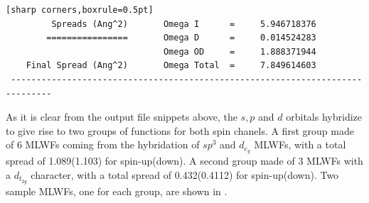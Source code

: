 \begin{enumerate}
\begin{tcolorbox}
{\begin{verbatim}[sharp corners,boxrule=0.5pt]
         Spreads (Ang^2)       Omega I      =     5.946718376
        ================       Omega D      =     0.014524283
                               Omega OD     =     1.888371944
    Final Spread (Ang^2)       Omega Total  =     7.849614603
 ------------------------------------------------------------------------------
	\end{verbatim}
	}
	\end{tcolorbox}
	As it is clear from the output file snippets above, the $s,p$ and $d$ orbitals hybridize to give rise to two groups of functions for both spin chanels. A first group made of 6 MLWFs coming from the hybridation of $sp^3$ and $d_{e_g}$ MLWFs, with a total spread of 1.089(1.103)\angsqd{} for spin-up(down). A second group made of 3 MLWFs with a $d_{t_{2g}}$ character, with a total spread of 0.432(0.4112)\angsqd{} for spin-up(down). Two sample MLWFs, one for each group, are shown in .
	\end{enumerate}

